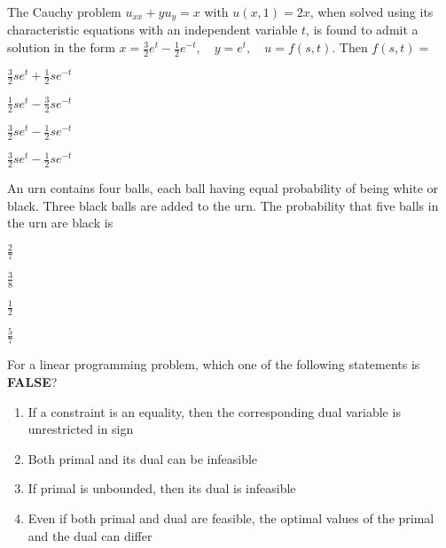 \item The Cauchy problem $ u_{xx} + y u_y = x $ with $ u(x, 1) = 2x $, when solved using its characteristic equations with an independent variable $ t $, is found to admit a solution in the form
$
x = \frac{3}{2} e^t - \frac{1}{2} e^{-t}, \quad y = e^t, \quad u = f(s, t).
$
Then $ f(s, t) = $
\begin{enumerate}
\begin{multicols}{2}
    \item $ \frac{3}{2} se^t + \frac{1}{2} se^{-t} $ 
    \columnbreak
    \item $ \frac{1}{2} se^t - \frac{3}{2} se^{-t} $ 
    \end{multicols}
    \begin{multicols}{2}
    \item $ \frac{3}{2} se^t - \frac{1}{2} se^{-t} $ 
    \item $ \frac{3}{2} se^t - \frac{1}{2} se^{-t} $ 
    \end{multicols}
\end{enumerate}
\bigskip
\item An urn contains four balls, each ball having equal probability of being white or black. Three black balls are added to the urn. The probability that five balls in the urn are black is
\begin{enumerate}
\begin{multicols}{4}
\item $\frac{2}{7}$
\item $\frac{3}{8}$
\item $\frac{1}{2}$
\item $\frac{5}{7}$
\end{multicols}
\end{enumerate}
\bigskip
\item For a linear programming problem, which one of the following statements is \textbf{FALSE}?
\begin{enumerate}
    \item If a constraint is an equality, then the corresponding dual variable is unrestricted in sign
    \item Both primal and its dual can be infeasible
    \item If primal is unbounded, then its dual is infeasible
    \item Even if both primal and dual are feasible, the optimal values of the primal and the dual can differ
\end{enumerate}

\bigskip

